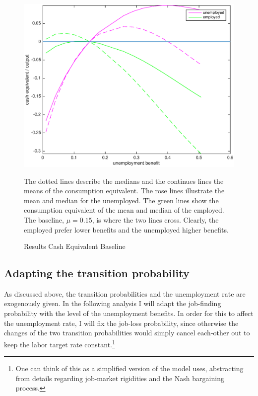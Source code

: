 \documentclass[a4paper,12pt]{article}
\begin{document}
\begin{figure}
\caption{Results Cash Equivalent Baseline } 
\label{baseline_ue_vs_e}	%
\centering
\includegraphics[scale=.7]{Cash_equivalent_baseline}  %

\begin{minipage}{0.8\linewidth}
\footnotesize{The dotted lines describe the medians and the continues lines the means of the consumption equivalent. The rose lines illustrate the mean and median for the unemployed. The green lines show the consumption equivalent of the mean and median of the employed. The baseline, $\mu = 0.15$, is where the two lines cross. Clearly, the employed prefer lower benefits and the unemployed higher benefits. }
\end{minipage}

\end{figure}

\subsection{Adapting the transition probability}

As discussed above, the transition probabilities and the unemployment rate are exogenously given. In the following analysis I will adapt the job-finding probability with the level of the unemployment benefits. In order for this to affect the unemployment rate, I will fix the job-loss probability, since otherwise the changes of the two transition probabilities would simply cancel each-other out to keep the labor target rate constant.\footnote{One can think of this as a simplified version of the model \cite{mukoyama} uses, abstracting from details regarding job-market rigidities and the Nash bargaining process.} 
\end{document}

